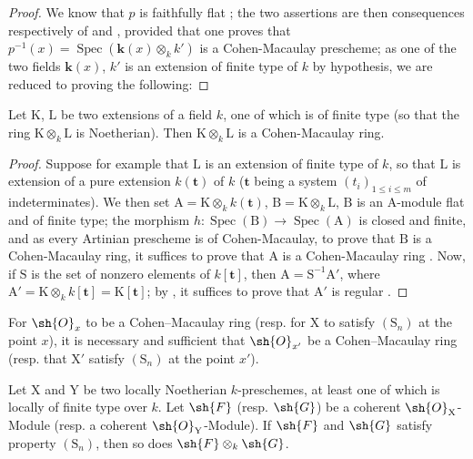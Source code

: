 \begin{proof}
We know that $p$ is faithfully flat ; the two assertions are then consequences respectively of  and , provided that one proves that $p^{-1}(x)=\operatorname{Spec}(\boldsymbol{k}(x)\otimes_k k')$ is a Cohen-Macaulay prescheme; as one of the two fields $\boldsymbol{k}(x)$, $k'$ is an extension of finite type of $k$ by hypothesis, we are reduced to proving the following:
\end{proof}

\begin{lemma}[6.7.1.1]
\label{IV.6.7.1.1}
Let $\mathrm{K}$, $\mathrm{L}$ be two extensions of a field $k$, one of which is of finite type (so that the ring $\mathrm{K}\otimes_k\mathrm{L}$ is Noetherian). Then $\mathrm{K}\otimes_k\mathrm{L}$ is a Cohen-Macaulay ring.
\end{lemma}

\begin{proof}
Suppose for example that $\mathrm{L}$ is an extension of finite type of $k$, so that $\mathrm{L}$ is extension of a pure extension $k(\mathbf{t})$ of $k$ ($\mathbf{t}$ being a system $(t_i)_{1\leqslant i\leqslant m}$ of indeterminates). We then set $\mathrm{A}=\mathrm{K}\otimes_k k(\mathbf{t})$, $\mathrm{B}=\mathrm{K}\otimes_k\mathrm{L}$, $\mathrm{B}$ is an $\mathrm{A}$-module flat  and of finite type; the morphism $h:\operatorname{Spec}(\mathrm{B})\to\operatorname{Spec}(\mathrm{A})$ is closed and finite, and as every Artinian prescheme is of Cohen-Macaulay, to prove that $\mathrm{B}$ is a Cohen-Macaulay ring, it suffices to prove that $\mathrm{A}$ is a Cohen-Macaulay ring . Now, if $\mathrm{S}$ is the set of nonzero elements of $k[\mathbf{t}]$, then $\mathrm{A}=\mathrm{S}^{-1}\mathrm{A}'$, where $\mathrm{A}'=\mathrm{K}\otimes_k k[\mathbf{t}]=\mathrm{K}[\mathbf{t}]$; by , it suffices to prove that $\mathrm{A}'$ is regular .
\end{proof}

\begin{corollary}[6.7.2]
\label{IV.6.7.2}
For $\sh{O}_x$ to be a Cohen--Macaulay ring (resp. for $\mathrm{X}$ to satisfy $(\mathrm{S}_n)$ at the point $x$), it is necessary and sufficient that $\sh{O}_{x'}$ be a Cohen--Macaulay ring (resp. that $\mathrm{X}'$ satisfy $(\mathrm{S}_n)$ at the point $x'$).
\end{corollary}

\begin{corollary}[6.7.3]
\label{IV.6.7.3}
Let $\mathrm{X}$ and $\mathrm{Y}$ be two locally Noetherian $k$-preschemes, at least one of which is locally of finite type over $k$. Let $\sh{F}$ (resp. $\sh{G}$) be a coherent $\sh{O}_{\mathrm{X}}$-Module (resp. a coherent $\sh{O}_{\mathrm{Y}}$-Module). If $\sh{F}$ and $\sh{G}$ satisfy property $(\mathrm{S}_n)$, then so does $\sh{F}\otimes_k\sh{G}$.
\end{corollary}

